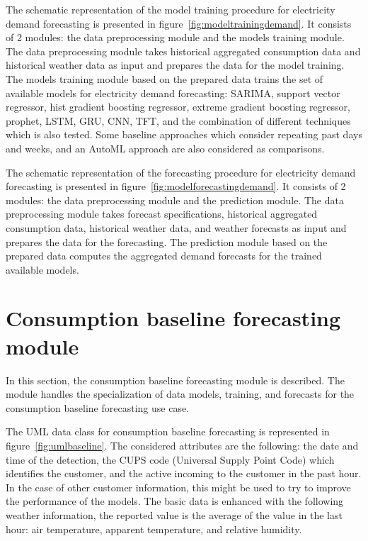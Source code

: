 The schematic representation of the model training procedure for electricity demand forecasting is presented in figure~\ref{fig:modeltrainingdemand}.
It consists of 2 modules: the data preprocessing module and the models training module.
The data preprocessing module takes historical aggregated consumption data and historical weather data as input and prepares the data for the model training.
The models training module based on the prepared data trains the set of available models for electricity demand forecasting: SARIMA, support vector regressor, hist gradient boosting regressor, extreme gradient boosting regressor, prophet, LSTM, GRU, CNN, TFT, and the combination of different techniques which is also tested.
Some baseline approaches which consider repeating past days and weeks, and an AutoML approach are also considered as comparisons.

The schematic representation of the forecasting procedure for electricity demand forecasting is presented in figure~\ref{fig:modelforecastingdemand}.
It consists of 2 modules: the data preprocessing module and the prediction module.
The data preprocessing module takes forecast specifications, historical aggregated consumption data, historical weather data, and weather forecasts as input and prepares the data for the forecasting.
The prediction module based on the prepared data computes the aggregated demand forecasts for the trained available models.


\section{Consumption baseline forecasting module}
\label{sec:baselinemodel}
\vspace{0.2 cm}

In this section, the consumption baseline forecasting module is described.
The module handles the specialization of data models, training, and forecasts for the consumption baseline forecasting use case.

The UML data class for consumption baseline forecasting is represented in figure~\ref{fig:umlbaseline}.
The considered attributes are the following: the date and time of the detection, the CUPS code (Universal Supply Point Code) which identifies the customer, and the active incoming to the customer in the past hour.
In the case of other customer information, this might be used to try to improve the performance of the models.
The basic data is enhanced with the following weather information, the reported value is the average of the value in the last hour: air temperature, apparent temperature, and relative humidity.

